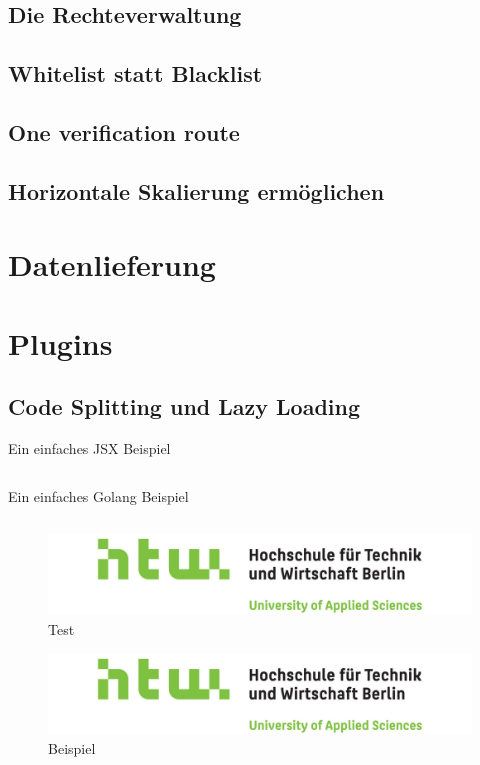 \subsection{Die Rechteverwaltung}
\subsection{Whitelist statt Blacklist}
\subsection{One verification route}
\subsection{Horizontale Skalierung ermöglichen}


\section{Datenlieferung}

\section{Plugins}
\subsection{Code Splitting und Lazy Loading}

\begin{listing}
    \label{lst:HelloJSX}
    \caption{Ein einfaches JSX Beispiel}
    \inputminted{jsx}{snippets/examples/Welcome.jsx}
\end{listing}

\begin{listing}
    \label{lst:Golang}
    \caption{Ein einfaches Golang Beispiel}
    \inputminted{go}{snippets/examples/hello.go}
\end{listing}

\newpage

\begin{figure}
    \label{figure:test}
    \includegraphics[scale=0.2]{img/HTW}
    \caption{Test}
\end{figure}

\begin{figure}
    \label{figure:beispiel}
    \includegraphics[scale=0.2]{img/HTW}
    \caption{Beispiel}
\end{figure}
